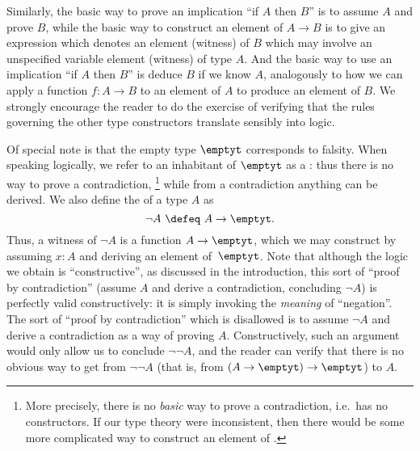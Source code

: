 Similarly, the basic way to prove an implication ``if $A$ then $B$'' is to assume $A$ and prove $B$, while the basic way to construct an element of $A\to B$ is to give an expression which denotes an element (witness) of $B$ which may involve an unspecified variable element (witness) of type $A$.
And the basic way to use an implication ``if $A$ then $B$'' is deduce $B$ if we know $A$, analogously to how we can apply a function $f:A\to B$ to an element of $A$ to produce an element of $B$.
We strongly encourage the reader to do the exercise of verifying that the rules governing the other type constructors translate sensibly into logic.

Of special note is that the empty type $\emptyt$ corresponds to falsity.
When speaking logically, we refer to an inhabitant of $\emptyt$ as a :
%
thus there is no way to prove a contradiction,%
\footnote{More precisely, there is no \emph{basic} way to prove a contradiction, i.e.\ \emptyt has no constructors.
If our type theory were inconsistent, then there would be some more complicated way to construct an element of \emptyt.}
while from a contradiction anything can be derived.
We also define the 
%
of a type $A$ as
%
\begin{equation*}
  \neg A \ \defeq\ A \to \emptyt.
\end{equation*}
%
Thus, a witness of $\neg A$ is a function $A \to \emptyt$, which we may construct by assuming $x : A$ and deriving an element of~$\emptyt$.
%
Note that although the logic we obtain is ``constructive'', as discussed in the introduction, this sort of ``proof by contradiction'' (assume $A$ and derive a contradiction, concluding $\neg A$) is perfectly valid constructively: it is simply invoking the \emph{meaning} of ``negation''.
The sort of ``proof by contradiction'' which is disallowed is to assume $\neg A$ and derive a contradiction as a way of proving $A$.
Constructively, such an argument would only allow us to conclude $\neg\neg A$, and the reader can verify that there is no obvious way to get from $\neg\neg A$ (that is, from $(A\to \emptyt)\to\emptyt$) to $A$.

\mentalpause

